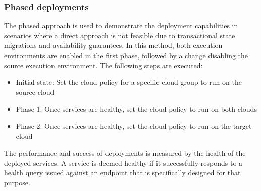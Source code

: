 \documentclass[../main.tex]{subfiles}
\begin{document}
    \subsubsection{Phased deployments}

    The phased approach is used to demonstrate the deployment capabilities in scenarios where a direct approach is not feasible due to transactional state migrations and availability guarantees.
    In this method, both execution environments are enabled in the first phase, followed by a change disabling the source execution environment.
    The following steps are executed:
    \begin{itemize}
        \setlength\itemsep{0em}
        \item Initial state: Set the \gls{cloud} policy for a specific \gls{cloud} group to run on the source \gls{cloud}
        \item Phase 1: Once services are healthy, set the \gls{cloud} policy to run on both \glspl{cloud}
        \item Phase 2: Once services are healthy, set the \gls{cloud} policy to run on the target \gls{cloud}
    \end{itemize}

    The performance and success of deployments is measured by the health of the deployed services.
    A service is deemed healthy if it successfully responds to a health query issued against an endpoint that is specifically designed for that purpose.
\end{document}
